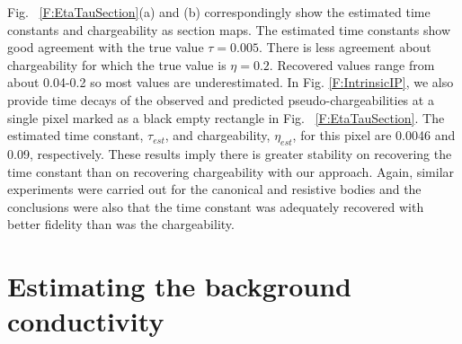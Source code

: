 \documentclass[extra,mreferee]{gji}
\newcommand{\siginf}{\sigma_\infty}
\begin{document}
Fig. ~\ref{F:EtaTauSection}(a) and (b) correspondingly show the estimated time constants and chargeability as section maps.
The estimated time constants show good agreement with the true value $\tau= 0.005$.
There is less agreement about chargeability for which the true value is $\eta=0.2$. Recovered values range from about 0.04-0.2 so most values are underestimated.
In Fig. \ref{F:IntrinsicIP}, we also provide time decays of the observed and predicted pseudo-chargeabilities at a single pixel marked as a black empty rectangle in Fig. ~\ref{F:EtaTauSection}. The estimated time constant,  $\tau_{est}$, and chargeability, $\eta_{est}$, for this pixel are 0.0046 and 0.09, respectively.
These results imply there is greater  stability on recovering the time constant than on recovering chargeability with our approach. Again, similar experiments were carried out for the canonical and resistive bodies and the conclusions were also that the time constant was adequately recovered with better fidelity than was the chargeability.

\section{Estimating the background conductivity}
\end{document}
